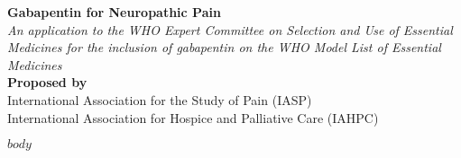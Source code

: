 \documentclass[10pt]{article}
\begin{document}
\begin{center}
\large{\textbf{Gabapentin for Neuropathic Pain}}\\
\vspace{5mm}
\large{\textit{An application to the WHO Expert Committee on Selection and Use of Essential Medicines for the inclusion of gabapentin on the WHO Model List of Essential Medicines}}\\
\vspace{5mm}
\small{\textbf{Proposed by}}\\
\small{International Association for the Study of Pain (IASP)\\ International Association for Hospice and Palliative Care (IAHPC)}
\end{center}

\begin{FlushLeft} %

$body$

\end{FlushLeft}
\end{document}
